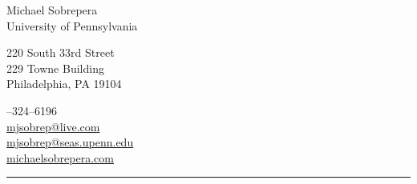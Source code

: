 \begin{center}
    {\LARGE Michael Sobrepera}\\[.5cm]
    University of Pennsylvania\\
    \begin{minipage}[c]{.35\textwidth}
    220 South 33rd Street\\
    229 Towne Building\\
    Philadelphia, PA 19104\\[.2cm]
    \end{minipage}
    \hspace{.28\textwidth}
    \begin{minipage}[r]{.35\textwidth}
    --324--6196\\
    \href{mailto:mjsobrep@live.com}{mjsobrep@live.com}\\
    \href{mailto:mjsobrep@seas.upenn.edu}{mjsobrep@seas.upenn.edu}\\
    \href{http://michaelsobrepera.com}{michaelsobrepera.com}\\
    \end{minipage}
    \end{center}
    \hrule
    \vspace{.4cm}
